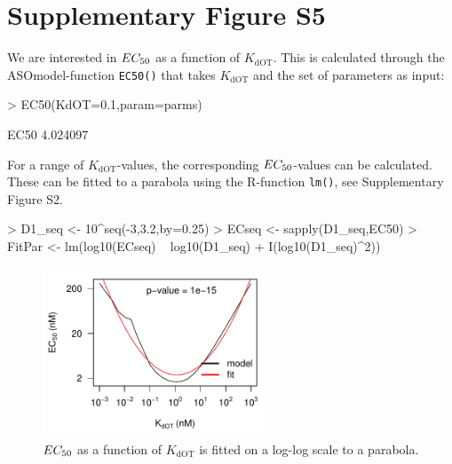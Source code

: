 \documentclass[a4paper,11pt]{article}
\newenvironment{Ncenter}{%
  \setlength\topsep{-10pt}
  \setlength\parskip{-10pt}
  \begin{center}
}{%
  \end{center}
}
\newcommand{\EC}{EC_{\rm{50}}}
\newcommand{\KdOT}{K_{\mathrm{dOT}}}
\begin{document}
\section{Supplementary Figure S5}
 We are interested in $\EC$ as a function of $\KdOT$. This is calculated through the ASOmodel-function \texttt{EC50()} that takes $\KdOT$ and the set of parameters as input:
\begin{Schunk}
\begin{Sinput}
> EC50(KdOT=0.1,param=parms)
\end{Sinput}
\begin{Soutput}
    EC50 
4.024097 
\end{Soutput}
\end{Schunk}
For a range of $\KdOT$-values, the corresponding $\EC$-values can be calculated. These can be fitted to a parabola using the R-function \texttt{lm()}, see Supplementary Figure S2. 
\begin{Schunk}
\begin{Sinput}
> D1_seq <- 10^seq(-3,3.2,by=0.25)
> ECseq <- sapply(D1_seq,EC50)
> FitPar <- lm(log10(ECseq) ~ log10(D1_seq) + I(log10(D1_seq)^2))
\end{Sinput}
\end{Schunk}
\begin{figure}[!h]
\begin{Ncenter}
\includegraphics[width=0.6\textwidth]{SuppFile1-S31.pdf}
\end{Ncenter}
\caption{$\EC$ as a function of $\KdOT$ is fitted on a log-log scale to a parabola.}\label{fig::Optfit}
\end{figure}
\end{document}
